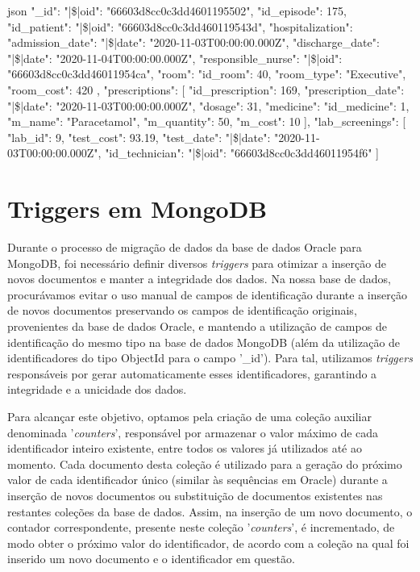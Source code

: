 \begin{myminted}{json}
{
  "_id": {"|\$|oid": "66603d8cc0c3dd4601195502"},
  "id_episode": 175,
  "id_patient": {"|\$|oid": "66603d8cc0c3dd460119543d"},
  "hospitalization": {
    "admission_date": {"|\$|date": "2020-11-03T00:00:00.000Z"},
    "discharge_date": {"|\$|date": "2020-11-04T00:00:00.000Z"},
    "responsible_nurse": {"|\$|oid": "66603d8cc0c3dd46011954ca"},
    "room": {
      "id_room": 40,
      "room_type": "Executive",
      "room_cost": 420
    }
  },
  "prescriptions": [
    {
      "id_prescription": 169,
      "prescription_date": {"|\$|date": "2020-11-03T00:00:00.000Z"},
      "dosage": 31,
      "medicine": {
        "id_medicine": 1,
        "m_name": "Paracetamol",
        "m_quantity": 50,
        "m_cost": 10
      }
    }
  ],
  "lab_screenings": [
    {
      "lab_id": 9,
      "test_cost": 93.19,
      "test_date": {"|\$|date": "2020-11-03T00:00:00.000Z"},
      "id_technician": {"|\$|oid": "66603d8cc0c3dd46011954f6"}
    }
  ]
}

\end{myminted}



\section{Triggers em MongoDB}
Durante o processo de migração de dados da base de dados Oracle para MongoDB, foi necessário definir diversos \textit{triggers} para otimizar a inserção de novos documentos e manter a integridade dos dados. Na nossa base de dados, procurávamos evitar o uso manual de campos de identificação durante a inserção de novos documentos preservando os campos de identificação originais, provenientes da base de dados Oracle, e mantendo a utilização de campos de identificação do mesmo tipo na base de dados MongoDB (além da utilização de identificadores do tipo ObjectId para o campo '\_id'). Para tal, utilizamos \textit{triggers} responsáveis por gerar automaticamente esses identificadores, garantindo a integridade e a unicidade dos dados.

Para alcançar este objetivo, optamos pela criação de uma coleção auxiliar denominada '\textit{counters}', responsável por armazenar o valor máximo de cada identificador inteiro existente, entre todos os valores já utilizados até ao momento. Cada documento desta coleção é utilizado para a geração do próximo valor de cada identificador único (similar às sequências em Oracle) durante a inserção de novos documentos ou substituição de documentos existentes nas restantes coleções da base de dados. Assim, na inserção de um novo documento, o contador correspondente, presente neste coleção '\textit{counters}', é incrementado, de modo obter o próximo valor do identificador, de acordo com a coleção na qual foi inserido um novo documento e o identificador em questão.

